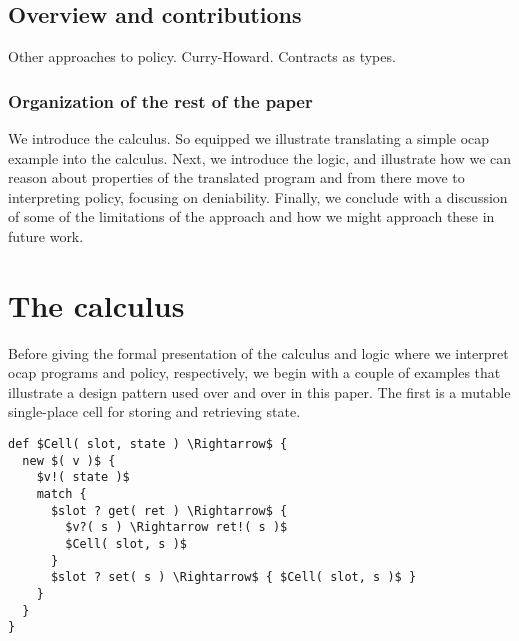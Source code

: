 \documentclass[]{amsart}
\theoremstyle{definition}
\theoremstyle{remark}
\numberwithin{equation}{subsection}
\begin{document}
\subsection{Overview and contributions} 

Other approaches to policy. Curry-Howard. Contracts as types.

\subsubsection{Organization of the rest of the paper}

We introduce the calculus. So equipped we illustrate translating a
simple ocap example into the calculus. Next, we introduce the logic,
and illustrate how we can reason about properties of the translated
program and from there move to interpreting policy, focusing on
deniability. Finally, we conclude with a discussion of some of the
limitations of the approach and how we might approach these in future
work.


\section{The calculus}

Before giving the formal presentation of the calculus and logic where
we interpret ocap programs and policy, respectively, we begin with a
couple of examples that illustrate a design pattern used over and over
in this paper. The first is a mutable single-place cell for storing
and retrieving state.


\begin{lstlisting}[mathescape]
def $Cell( slot, state ) \Rightarrow$ {
  new $( v )$ {
    $v!( state )$
    match {
      $slot ? get( ret ) \Rightarrow$ {
        $v?( s ) \Rightarrow ret!( s )$
        $Cell( slot, s )$
      }
      $slot ? set( s ) \Rightarrow$ { $Cell( slot, s )$ }
    }
  }
}
\end{lstlisting}
\end{document}

